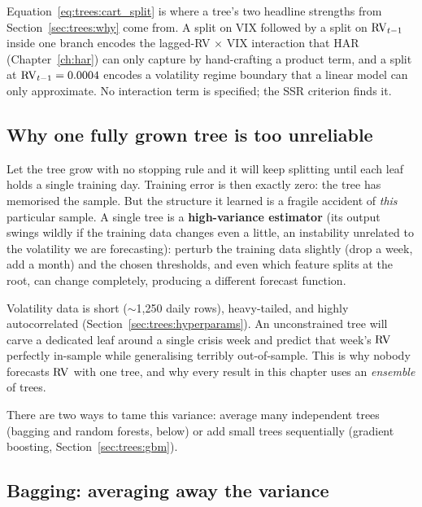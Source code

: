 \begin{projectconnection}
Equation~\ref{eq:trees:cart_split} is where a tree's two headline strengths
from Section~\ref{sec:trees:why} come from.  A split on VIX followed by a
split on $\operatorname{RV}_{t-1}$ inside one branch encodes the lagged-RV$\,\times\,$VIX
interaction that HAR (Chapter~\ref{ch:har}) can only capture by hand-crafting
a product term, and a split at $\operatorname{RV}_{t-1} = 0.0004$ encodes a volatility
regime boundary that a linear model can only approximate.  No interaction
term is specified; the SSR criterion finds it.
\end{projectconnection}

\subsection{Why one fully grown tree is too unreliable}

Let the tree grow with no stopping rule and it will keep splitting until each
leaf holds a single training day.  Training error is then exactly zero: the
tree has memorised the sample.  But the structure it learned is a fragile
accident of \emph{this} particular sample.  A single tree is a
\textbf{high-variance estimator} (its output swings wildly if the training
data changes even a little, an instability unrelated to the volatility we are
forecasting): perturb the training data slightly
(drop a week, add a month) and the chosen thresholds, and even which feature
splits at the root, can change completely, producing a different forecast
function.

\begin{warning}
Volatility data is short ($\sim$1{,}250 daily rows), heavy-tailed, and highly
autocorrelated (Section~\ref{sec:trees:hyperparams}).  An unconstrained tree
will carve a dedicated leaf around a single crisis week and predict that
week's $\operatorname{RV}$ perfectly in-sample while generalising terribly out-of-sample.
This is why nobody forecasts $\operatorname{RV}$ with one tree, and why every result in
this chapter uses an \emph{ensemble} of trees.
\end{warning}

There are two ways to tame this variance: average many independent trees
(bagging and random forests, below) or add small trees sequentially
(gradient boosting, Section~\ref{sec:trees:gbm}).

\subsection{Bagging: averaging away the variance}

